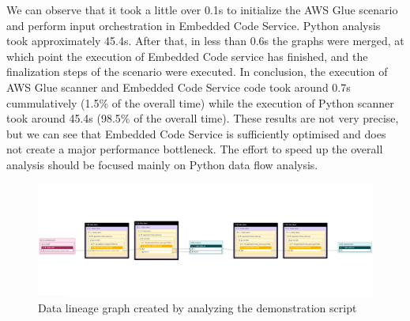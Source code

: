 We can observe that it took a little over 0.1s to initialize the AWS Glue scenario and perform input orchestration in Embedded Code Service. Python analysis took approximately 45.4s. After that, in less than 0.6s the graphs were merged, at which point the execution of Embedded Code service has finished, and the finalization steps of the scenario were executed. In conclusion, the execution of AWS Glue scanner and Embedded Code Service code took around 0.7s cummulatively (1.5\% of the overall time) while the execution of Python scanner took around 45.4s (98.5\% of the overall time). These results are not very precise, but we can see that Embedded Code Service is sufficiently optimised and does not create a major performance bottleneck. The effort to speed up the overall analysis should be focused mainly on Python data flow analysis.


\begin{figure}[ht]\centering
\includegraphics[angle=90,origin=c,height=1.0\textwidth]{img/thesis_demo1.PNG}
\caption{Data lineage graph created by analyzing the demonstration script}
\label{fig:thesisDemo1}
\end{figure}

